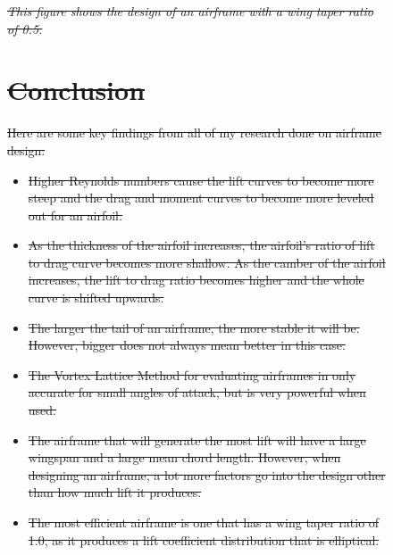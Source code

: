 \documentclass[journal]{new-aiaa} %
\providecommand{\DIFdel}[1]{{\protect\color{red}\sout{#1}}}                      %
\providecommand{\DIFdelFL}[1]{\DIFdel{#1}} %
\providecommand{\DIFdelbeginFL}{} %
\newcommand{\DIFscaledelfig}{0.5}
\newlength{\DIFdelgraphicswidth} %
\newlength{\DIFdelgraphicsheight} %
\newcommand{\DIFdelincludegraphics}[2][]{%
\sbox{\DIFdelgraphicsbox}{\DIFOincludegraphics[#1]{#2}}%
\settoboxwidth{\DIFdelgraphicswidth}{\DIFdelgraphicsbox} %
\settoboxtotalheight{\DIFdelgraphicsheight}{\DIFdelgraphicsbox} %
\scalebox{\DIFscaledelfig}{%
\parbox[b]{\DIFdelgraphicswidth}{\usebox{\DIFdelgraphicsbox}\\[-\baselineskip] \rule{\DIFdelgraphicswidth}{0em}}\llap{\resizebox{\DIFdelgraphicswidth}{\DIFdelgraphicsheight}{%
\setlength{\unitlength}{\DIFdelgraphicswidth}%
\begin{picture}(1,1)%
\thicklines\linethickness{2pt} %
{\color[rgb]{1,0,0}\put(0,0){\framebox(1,1){}}}%
{\color[rgb]{1,0,0}\put(0,0){\line( 1,1){1}}}%
{\color[rgb]{1,0,0}\put(0,1){\line(1,-1){1}}}%
\end{picture}%
}\hspace*{3pt}}} %
} %
\DeclareRobustCommand{\DIFdelbeginFL}{\DIFOdelbeginFL \let\includegraphics\DIFdelincludegraphics} %
\begin{document}
	\begin{figure}[H]
		\DIFdelbeginFL %
{%
\emph{\DIFdelFL{This figure shows the design of an airframe with a wing taper ratio of 0.5.}}%
}

\section{\DIFdel{Conclusion}}
\addtocounter{section}{-1}%
\DIFdel{Here are some key findings from all of my research done on airframe design:
	}%
\begin{itemize}%
\item%
\DIFdel{Higher Reynolds numbers cause the lift curves to become more steep and the drag and moment curves to become more leveled out for an airfoil.
		}%
\item%
\DIFdel{As the thickness of the airfoil increases, the airfoil's ratio of lift to drag curve becomes more shallow. As the camber of the airfoil increases, the lift to drag ratio becomes higher and the whole curve is shifted upwards. 
		}%
\item%
\DIFdel{The larger the tail of an airframe, the more stable it will be. However, bigger does not always mean better in this case.
		}%
\item%
\DIFdel{The Vortex Lattice Method for evaluating airframes in only accurate for small angles of attack, but is very powerful when used.
		}%
\item%
\DIFdel{The airframe that will generate the most lift will have a large wingspan and a large mean chord length. However, when designing an airframe, a lot more factors go into the design other than how much lift it produces.
		}%
\item%
\DIFdel{The most efficient airframe is one that has a wing taper ratio of 1.0, as it produces a lift coefficient distribution that is elliptical. }
\end{itemize}%


\end{figure}
\end{document}
